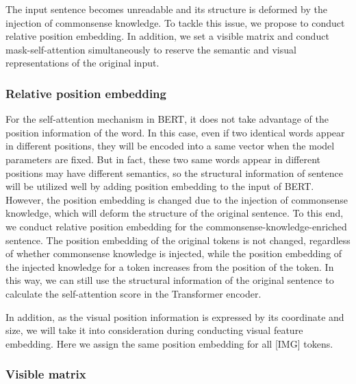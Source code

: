 \documentclass[conference]{IEEEtran}
\begin{document}
The input sentence becomes unreadable and its structure is deformed by the injection of commonsense knowledge. To tackle this issue, we propose to conduct relative position embedding. In addition, we set a visible matrix and conduct mask-self-attention simultaneously to reserve the semantic and visual representations of the original input. 

\subsubsection{Relative position embedding}



For the self-attention mechanism in BERT, it does not take advantage of the position information of the word. In this case, even if two identical words appear in different positions, they will be encoded into a same vector when the model parameters are fixed. But in fact, these two same words appear in different positions may have different semantics, so the structural information of sentence will be utilized well by adding position embedding to the input of BERT. However, the position embedding is changed due to the injection of commonsense knowledge, which will deform the structure of the original sentence. To this end, we conduct relative position embedding for the commonsense-knowledge-enriched sentence. The position embedding of the original tokens is not changed, regardless of whether commonsense knowledge is injected, while the position embedding of the injected knowledge for a token increases from the position of the token. In this way, we can still use the structural information of the original sentence to calculate the self-attention score in the Transformer encoder. 

In addition, as the visual position information is expressed by its coordinate and size, we will take it into consideration during conducting visual feature embedding. Here we assign the same position embedding for all [IMG] tokens. 
\subsubsection{Visible matrix}
\end{document}

